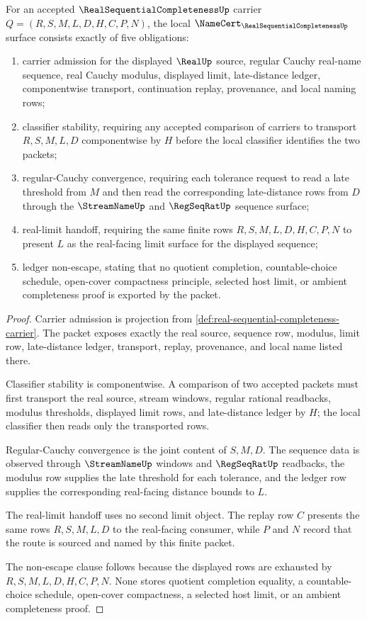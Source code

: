 \begin{theorem}
\label{thm:real-sequential-completeness-namecert-obligations}
For an accepted $\RealSequentialCompletenessUp$ carrier $Q=(R,S,M,L,D,H,C,P,N)$, the local $\NameCert_{\RealSequentialCompletenessUp}$ surface consists exactly of five obligations:
\begin{enumerate}
\item carrier admission for the displayed $\RealUp$ source, regular Cauchy real-name sequence, real Cauchy modulus, displayed limit, late-distance ledger, componentwise transport, continuation replay, provenance, and local naming rows;
\item classifier stability, requiring any accepted comparison of carriers to transport $R,S,M,L,D$ componentwise by $H$ before the local classifier identifies the two packets;
\item regular-Cauchy convergence, requiring each tolerance request to read a late threshold from $M$ and then read the corresponding late-distance rows from $D$ through the $\StreamNameUp$ and $\RegSeqRatUp$ sequence surface;
\item real-limit handoff, requiring the same finite rows $R,S,M,L,D,H,C,P,N$ to present $L$ as the real-facing limit surface for the displayed sequence;
\item ledger non-escape, stating that no quotient completion, countable-choice schedule, open-cover compactness principle, selected host limit, or ambient completeness proof is exported by the packet.
\end{enumerate}
\end{theorem}
\begin{proof}
Carrier admission is projection from \autoref{def:real-sequential-completeness-carrier}. The packet exposes exactly the real source, sequence row, modulus, limit row, late-distance ledger, transport, replay, provenance, and local name listed there.

Classifier stability is componentwise. A comparison of two accepted packets must first transport the real source, stream windows, regular rational readbacks, modulus thresholds, displayed limit rows, and late-distance ledger by $H$; the local classifier then reads only the transported rows.

Regular-Cauchy convergence is the joint content of $S,M,D$. The sequence data is observed through $\StreamNameUp$ windows and $\RegSeqRatUp$ readbacks, the modulus row supplies the late threshold for each tolerance, and the ledger row supplies the corresponding real-facing distance bounds to $L$.

The real-limit handoff uses no second limit object. The replay row $C$ presents the same rows $R,S,M,L,D$ to the real-facing consumer, while $P$ and $N$ record that the route is sourced and named by this finite packet.

The non-escape clause follows because the displayed rows are exhausted by $R,S,M,L,D,H,C,P,N$. None stores quotient completion equality, a countable-choice schedule, open-cover compactness, a selected host limit, or an ambient completeness proof.
\end{proof}

